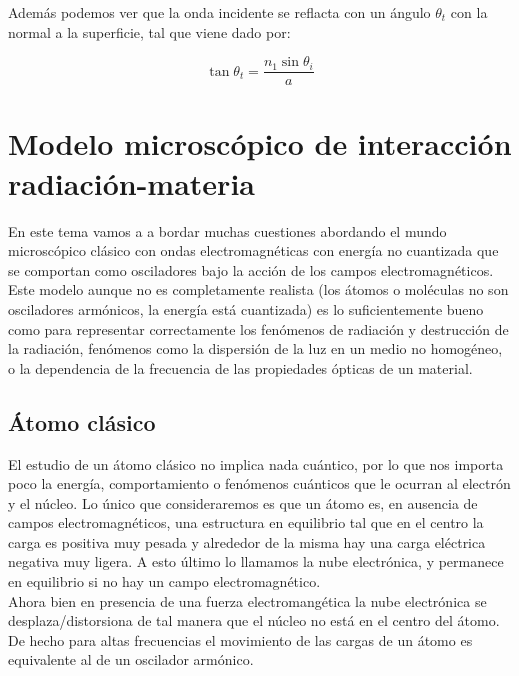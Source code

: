 \documentclass[12pt]{article}
\numberwithin{equation}{section}
\numberwithin{figure}{section}
\begin{document}
Además podemos ver que la onda incidente se reflacta con un ángulo $\theta_t$ con la normal a la superficie, tal que viene dado por:

\begin{equation}
\tan \theta_t = \dfrac{n_1 \sin \theta_i}{a}
\end{equation}

\newpage

\section{Modelo microscópico de interacción radiación-materia}

En este tema vamos a a bordar muchas cuestiones abordando el mundo microscópico clásico con ondas electromagnéticas con energía no cuantizada que se comportan como osciladores bajo la acción de los campos electromagnéticos. Este modelo aunque no es completamente realista (los átomos o moléculas no son osciladores armónicos, la energía está cuantizada) es lo suficientemente bueno como para representar correctamente los fenómenos  de radiación y destrucción de la radiación, fenómenos como la dispersión de la luz en un medio no homogéneo, o la dependencia de la frecuencia de las propiedades ópticas de un material. \\

\subsection{Átomo clásico}

El estudio de un átomo clásico no implica nada cuántico, por lo que nos importa poco la energía, comportamiento o fenómenos cuánticos que le ocurran al electrón y el núcleo. Lo único que consideraremos es que un átomo es, en ausencia de campos electromagnéticos, una estructura en equilibrio tal que en el centro la carga es positiva muy pesada y alrededor de la misma hay una carga eléctrica negativa muy ligera. A esto último lo llamamos la nube electrónica, y permanece en equilibrio si no hay un campo electromagnético. \\

Ahora bien en presencia de una fuerza electromangética la nube electrónica se desplaza/distorsiona de tal manera que el núcleo no está en el centro del átomo. De hecho para altas frecuencias el movimiento de las cargas de un átomo es equivalente al de un oscilador armónico. \\
\end{document}
